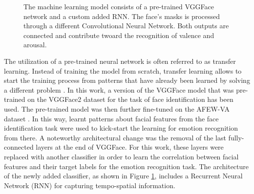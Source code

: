 \begin{figure}[H]
  \begin{center}
  \caption[ER pipeline step \#6: Machine learning model]{The machine learning model consists of a pre-trained VGGFace network and a custom added RNN. The face's masks is processed through a different Convolutional Neural Network. Both outputs are connected and contribute twoard the recognition of valence and arousal.}
  \label{fig:MachineLearningModel}
  \end{center}
\end{figure}

The utilization of a pre-trained neural network is often referred to as transfer learning. Instead of training the model from scratch, transfer learning allows to start the training process from patterns that have already been learned by solving a different problem \citep{Pan:2010:SurveyOnTransferLearning}.
\newline\newline
In this work, a version of the VGGFace model that was pre-trained on the VGGFace2 dataset \citep{Cao:2018:VGGFace2} for the task of face identification has been used. The pre-trained model was then further fine-tuned on the AFEW-VA dataset \citep{Kossaifi:2017:AFEW-VADatabase}. In this way, learnt patterns about facial features from the face identification task were used to kick-start the learning for emotion recognition from there. 
\newline\newline
A noteworthy architectural change was the removal of the last fully-connected layers at the end of VGGFace. For this work, these layers were replaced with another classifier in order to learn the correlation between facial features and their target labels for the emotion recognition task. The architecture of the newly added classifier, as shown in Figure \ref{fig:MachineLearningModel}, includes a Recurrent Neural Network (RNN) for capturing tempo-spatial information.